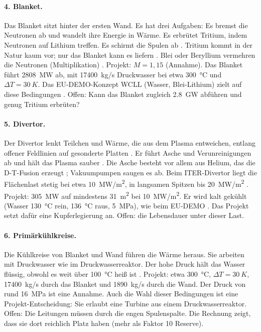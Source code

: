 \paragraph{4. Blanket.} Das Blanket sitzt hinter der ersten Wand. Es hat drei Aufgaben: Es bremst die Neutronen ab und wandelt ihre Energie in Wärme. Es erbrütet Tritium, indem Neutronen auf Lithium treffen. Es schirmt die Spulen ab \cite{bt_breeding,bt_iter_blanket}. Tritium kommt in der Natur kaum vor; nur das Blanket kann es liefern \cite{bt_breeding}. Blei oder Beryllium vermehren die Neutronen (Multiplikation) \cite{bt_breeding}. Projekt: $M = 1{,}15$ (Annahme). Das Blanket führt \SI{2808}{MW} ab, mit \SI{17400}{kg/s} Druckwasser bei etwa \SI{300}{\celsius} und $\Delta T = \SI{30}{K}$. Das EU-DEMO-Konzept WCLL (Wasser, Blei-Lithium) zielt auf diese Bedingungen \cite{arena2023}. Offen: Kann das Blanket zugleich \SI{2,8}{GW} abführen und genug Tritium erbrüten?

\paragraph{5. Divertor.} Der Divertor lenkt Teilchen und Wärme, die aus dem Plasma entweichen, entlang offener Feldlinien auf gesonderte Platten \cite{bt_divertor}. Er führt Asche und Verunreinigungen ab und hält das Plasma sauber \cite{bt_iter_divertor}. Die Asche besteht vor allem aus Helium, das die D-T-Fusion erzeugt \cite{bt_dtfusion}; Vakuumpumpen saugen es ab. Beim ITER-Divertor liegt die Flächenlast stetig bei etwa \SI{10}{MW/m^2}, in langsamen Spitzen bis \SI{20}{MW/m^2} \cite{bt_iter_divertor}. Projekt: \SI{305}{MW} auf mindestens \SI{31}{m^2} bei \SI{10}{MW/m^2}. Er wird kalt gekühlt (Wasser \SI{130}{\celsius} rein, \SI{136}{\celsius} raus, \SI{5}{MPa}), wie beim EU-DEMO \cite{you2022}. Das Projekt setzt dafür eine Kupferlegierung an. Offen: die Lebensdauer unter dieser Last.

\paragraph{6. Primärkühlkreise.} Die Kühlkreise von Blanket und Wand führen die Wärme heraus. Sie arbeiten mit Druckwasser wie im Druckwasserreaktor. Der hohe Druck hält das Wasser flüssig, obwohl es weit über \SI{100}{\celsius} heiß ist \cite{bt_pwr}. Projekt: etwa \SI{300}{\celsius}, $\Delta T = \SI{30}{K}$, \SI{17400}{kg/s} durch das Blanket und \SI{1890}{kg/s} durch die Wand. Der Druck von rund \SI{16}{MPa} ist eine Annahme. Auch die Wahl dieser Bedingungen ist eine Projekt-Entscheidung: Sie erlaubt eine Turbine aus einem Druckwasserreaktor. Offen: Die Leitungen müssen durch die engen Spulenspalte. Die Rechnung zeigt, dass sie dort reichlich Platz haben (mehr als Faktor 10 Reserve).

